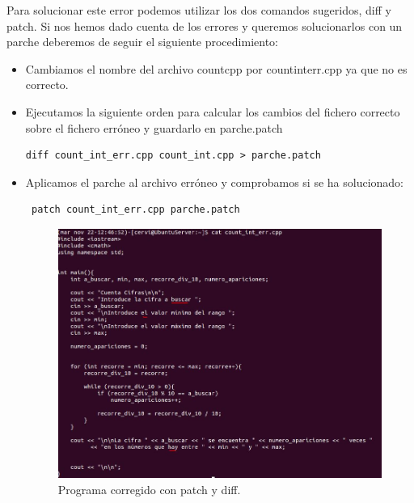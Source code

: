 Para solucionar este error podemos utilizar los dos comandos sugeridos, diff\cite{diff} y patch\cite{patch}. Si nos hemos dado cuenta de los errores y queremos solucionarlos con un parche  deberemos de seguir el siguiente procedimiento:
\begin{itemize}
	\item Cambiamos el nombre del archivo count\textunderscore cpp por count\textunderscore int\textunderscore err.cpp ya que no es correcto.
	\item Ejecutamos la siguiente orden para calcular los cambios del fichero correcto sobre el fichero erróneo y guardarlo en parche.patch\begin{verbatim}diff count_int_err.cpp count_int.cpp > parche.patch\end{verbatim}
	\vspace{9mm}
	\item Aplicamos el parche al archivo erróneo y comprobamos si se ha solucionado: \begin{verbatim} patch count_int_err.cpp parche.patch\end{verbatim}
	\begin{figure}[H]
		\centering
		\includegraphics[scale=0.75]{cifras-bien.jpg}
		\caption{Programa corregido con patch y diff. \label{fig:figura20}}
	\end{figure}
\end{itemize}
